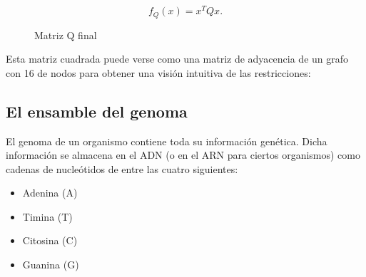 \documentclass[11pt]{article}
\begin{document}
\[ f_Q(x) = x^T Q x. \]

\begin{figure}[H]
	\centering
	\caption{Matriz Q final}
\end{figure}

Esta matriz cuadrada puede verse como una matriz de adyacencia de un grafo con 16 de nodos para obtener una visión intuitiva de las restricciones:

\begin{table}[H]
	\centering
	\caption{Graphical representation of penalties between interactions \cite{Sarkar2020}}
	\label{fig:salesman-penalties}
\end{table}

\subsection{El ensamble del genoma}

El genoma de un organismo contiene toda su información genética. Dicha información se almacena en el ADN (o en el ARN para ciertos organismos) como cadenas de nucleótidos de entre las cuatro siguientes:

\begin{itemize}
	\item Adenina (A)
	\item Timina (T)
	\item Citosina (C) 
	\item Guanina (G)
\end{itemize}
\end{document}
